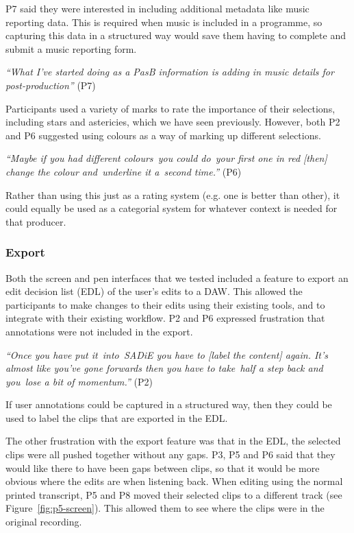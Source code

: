 P7 said they were interested in including additional metadata like music reporting data. This is required when music is
included in a programme, so capturing this data in a structured way would save them having to complete and submit a
music reporting form.

\textit{``What I've started doing as a PasB information is adding in music details for post-production''} (P7)


Participants used a variety of marks to rate the importance of their selections, including stars and astericies, which
we have seen previously. However, both P2 and P6 suggested using colours as a way of marking up different selections.

\textit{``Maybe if you had different colours you could do your first one in red [then]
  change the colour and underline it a second time.''} (P6)

Rather than using this just as a rating system (e.g. one is better than other), it could equally be used as a
categorial system for whatever context is needed for that producer.

\subsubsection{Export}

Both the screen and pen interfaces that we tested included a feature to export an edit decision list (EDL) of the
user's edits to a DAW. This allowed the participants to make changes to their edits using their existing tools, and to
integrate with their existing workflow.  P2 and P6 expressed frustration that annotations were not included in the
export.

\textit{``Once you have put it into SADiE you have to [label the content] again. It's almost like you've gone forwards
then you have to take half a step back and you lose a bit of momentum.''} (P2)

If user annotations could be captured in a structured way, then they could be used to label the clips that are exported
in the EDL.

The other frustration with the export feature was that in the EDL, the selected clips were all pushed together without
any gaps. P3, P5 and P6 said that they would like there to have been gaps between clips, so that it would be more
obvious where the edits are when listening back. When editing using the normal printed transcript, P5 and P8 moved
their selected clips to a different track (see Figure~\ref{fig:p5-screen}). This allowed them to see where the clips
were in the original recording.

